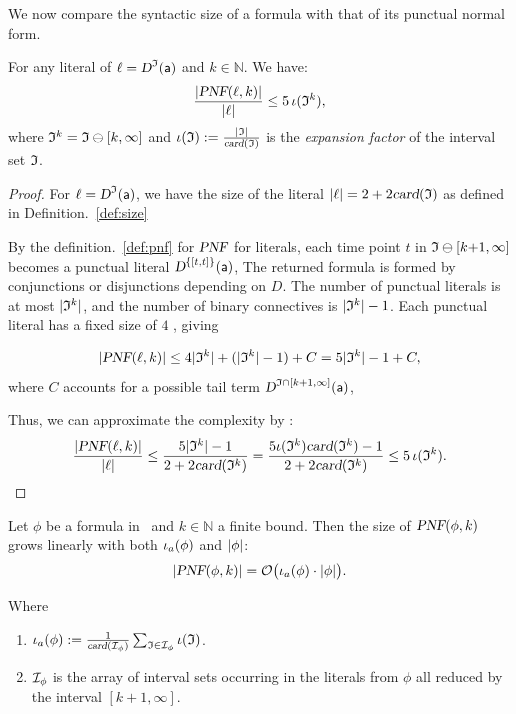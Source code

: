 We now compare the syntactic size of a formula with that of its punctual normal form.

\begin{lemma}\label{lem:pnf-literal-blowup}
For any literal of \TDDLfm $\ell = \textsl{D}^{\mathfrak{I}}(\mathsf{a})$   and  $k \in \mathbb{N}$. We have:
\[
\frac{\vert \textsl{PNF}(\ell,k)\vert}{\vert \ell\vert} 
\le 5\,\iota(\mathfrak{I}^k),
\]
where $\mathfrak{I}^k= \mathfrak{I} \ominus [k, \infty]$ and $\iota(\mathfrak{I}) := \frac{\vert \mathfrak{I}\vert}{\textsl{card}(\mathfrak{I})}$ is the \emph{expansion factor} of the interval set $\mathfrak{I}$.
\end{lemma}

\begin{proof}
For  $\ell = \textsl{D}^{\mathfrak{I}}(\mathsf{a})$, we have the size of the literal
$\vert \ell\vert = 2 + 2\textsl{card}(\mathfrak{I})
$ as defined in Definition.~\ref{def:size}

By the definition.~\ref{def:pnf} for $\textsl{PNF}$ for literals, each time point $t$ in $\mathfrak{I} \ominus [k{+}1,\infty]$ becomes a punctual literal $\textsl{D}^{\{[t,t]\}}(\mathsf{a})$, The returned formula is formed by conjunctions or disjunctions depending on $D$. The number of punctual literals is at most $\vert \mathfrak{I}^k\vert$, and the number of binary connectives is $\vert \mathfrak{I}^k\vert - 1$. Each punctual literal has a fixed size of $4$ , giving

\[
\vert \textsl{PNF}(\ell,k)\vert \le 4\vert \mathfrak{I}^k\vert + (\vert \mathfrak{I}^k\vert-1) + C 
= 5\vert \mathfrak{I}^k\vert - 1 + C,
\]
where $C$ accounts for a possible tail term $\textsl{D}^{\mathfrak{I} \cap [k+1, \infty]}(\mathsf{a})$,

Thus, we can approximate the complexity by :
\[
\frac{\vert \textsl{PNF}(\ell,k)\vert}{\vert \ell\vert}
\le \frac{5\vert \mathfrak{I}^k\vert-1}{2+2\textsl{card}(\mathfrak{I}^k)}
= \frac{5\iota(\mathfrak{I}^k)\textsl{card}(\mathfrak{I}^k)-1}{2+2\textsl{card}(\mathfrak{I}^k)}
\le 5\,\iota(\mathfrak{I}^k) .
\]
\end{proof}

\begin{lemma}\label{lem:pnf-size-expansion}
Let $\phi$ be a formula in \TDDLfm\ and $k \in \mathbb{N}$ a finite bound.
Then the size of $\textsl{PNF}(\phi,k)$ grows linearly with both $\iota_a(\phi)$ and $\vert \phi\vert$:
\[
\vert \textsl{PNF}(\phi,k)\vert = 
\mathcal{O}\big(\iota_a(\phi)\cdot \vert \phi\vert\big).
\]

Where 

\begin{enumerate}
\item $\expf_a(\phi) := 
\frac{1}{\card(\mathcall{I}_\phi)}
\sum_{\is \in \mathcall{I}_\phi} \expf(\is)$.
\item  $\mathcall{I}_\phi$ is the array of interval sets occurring in the literals from  $\phi$ all reduced by the interval $[k+1,\infty]$.\\
\end{enumerate}
\end{lemma}


